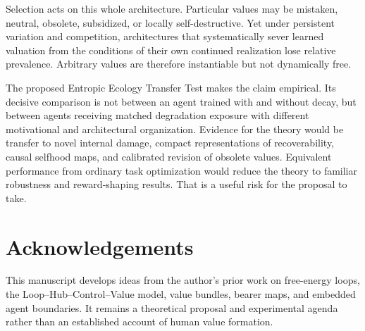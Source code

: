 \documentclass[11pt]{article}
\begin{document}
Selection acts on this whole architecture. Particular values may be mistaken, neutral, obsolete, subsidized, or locally self-destructive. Yet under persistent variation and competition, architectures that systematically sever learned valuation from the conditions of their own continued realization lose relative prevalence. Arbitrary values are therefore instantiable but not dynamically free.

The proposed Entropic Ecology Transfer Test makes the claim empirical. Its decisive comparison is not between an agent trained with and without decay, but between agents receiving matched degradation exposure with different motivational and architectural organization. Evidence for the theory would be transfer to novel internal damage, compact representations of recoverability, causal selfhood maps, and calibrated revision of obsolete values. Equivalent performance from ordinary task optimization would reduce the theory to familiar robustness and reward-shaping results. That is a useful risk for the proposal to take.

\section*{Acknowledgements}

This manuscript develops ideas from the author's prior work on free-energy loops, the Loop--Hub--Control--Value model, value bundles, bearer maps, and embedded agent boundaries. It remains a theoretical proposal and experimental agenda rather than an established account of human value formation.



\end{document}
